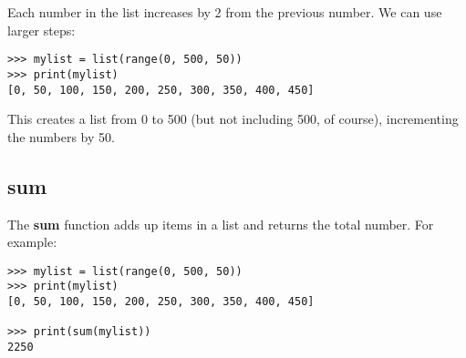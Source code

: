 \noindent
Each number in the list increases by 2 from the previous number. We can use larger steps:

\begin{listing}
\begin{verbatim}
>>> mylist = list(range(0, 500, 50))
>>> print(mylist)
[0, 50, 100, 150, 200, 250, 300, 350, 400, 450]
\end{verbatim}
\end{listing}

This creates a list from 0 to 500 (but not including 500, of course), incrementing the numbers by 50.

\subsection*{sum}

The \textbf{sum} function adds up items in a list and returns the total number. For example:

\begin{listing}
\begin{verbatim}
>>> mylist = list(range(0, 500, 50))
>>> print(mylist)
[0, 50, 100, 150, 200, 250, 300, 350, 400, 450]

>>> print(sum(mylist))
2250
\end{verbatim}
\end{listing}

\newpage
